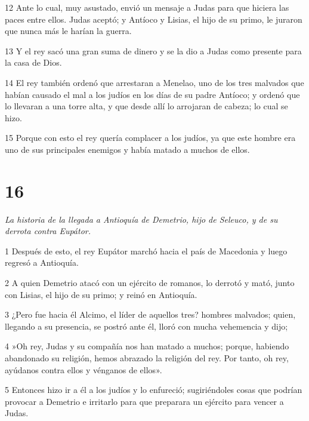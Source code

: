 \par 12 Ante lo cual, muy asustado, envió un mensaje a Judas para que hiciera las paces entre ellos. Judas aceptó; y Antíoco y Lisias, el hijo de su primo, le juraron que nunca más le harían la guerra.

\par 13 Y el rey sacó una gran suma de dinero y se la dio a Judas como presente para la casa de Dios.

\par 14 El rey también ordenó que arrestaran a Menelao, uno de los tres malvados que habían causado el mal a los judíos en los días de su padre Antíoco; y ordenó que lo llevaran a una torre alta, y que desde allí lo arrojaran de cabeza; lo cual se hizo.

\par 15 Porque con esto el rey quería complacer a los judíos, ya que este hombre era uno de sus principales enemigos y había matado a muchos de ellos.

\chapter{16}

\par \textit{La historia de la llegada a Antioquía de Demetrio, hijo de Seleuco, y de su derrota contra Eupátor.}

\par 1 Después de esto, el rey Eupátor marchó hacia el país de Macedonia y luego regresó a Antioquía.

\par 2 A quien Demetrio atacó con un ejército de romanos, lo derrotó y mató, junto con Lisias, el hijo de su primo; y reinó en Antioquía.

\par 3 ¿Pero fue hacia él Alcimo, el líder de aquellos tres? hombres malvados; quien, llegando a su presencia, se postró ante él, lloró con mucha vehemencia y dijo;

\par 4 »Oh rey, Judas y su compañía nos han matado a muchos; porque, habiendo abandonado su religión, hemos abrazado la religión del rey. Por tanto, oh rey, ayúdanos contra ellos y vénganos de ellos».

\par 5 Entonces hizo ir a él a los judíos y lo enfureció; sugiriéndoles cosas que podrían provocar a Demetrio e irritarlo para que preparara un ejército para vencer a Judas.

